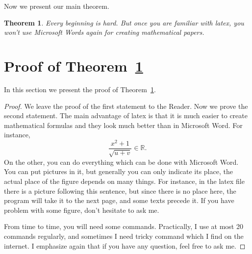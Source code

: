 \documentclass[12pt,a4paper]{amsart}
\numberwithin{equation}{section}
\theoremstyle{plain}
\newtheorem{Th}{Theorem}[section]
\theoremstyle{definition}
\begin{document}
Now we present our main theorem.

\begin{Th} \label{main} Every beginning is hard. But once you are familiar with latex, you won't use Microsoft Words again for creating mathematical papers.
\end{Th}

\section{Proof of Theorem~\ref{main}}

In this section we present the proof of Theorem~\ref{main}.

\begin{proof} We leave the proof of the first statement to the Reader. Now we prove the second statement. The main advantage of latex is that it is much easier to create mathematical formulas and they look much better than in Microsoft Word.
For instance,
$$\frac{x^2+1}{\sqrt{u+v}}\in \mathbb{R}.$$
On the other, you can do everything which can be done with Microsoft Word. You can put pictures in it, but generally you can only indicate its place, the actual place of the figure depends on many things. For instance, in the latex file there is a picture following this sentence, but since there is no place here, the program will take it to the next page, and some texts precede it. If you have problem with some figure, don't hesitate to ask me.

\begin{figure}[h!]
\end{figure}

From time to time, you will need some commands. Practically, I use at most 20 commands regularly, and sometimes I need tricky command which I find on the internet. I emphasize again that if you have any question, feel free to ask me.

\end{proof}
\end{document}
